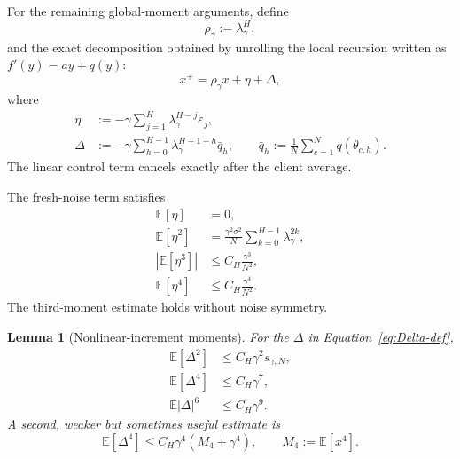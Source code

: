 \documentclass[11pt]{article}
\newtheorem{lemma}[lemma]{Lemma}
\theoremstyle{definition}
\newcommand{\E}{\mathbb{E}}
\newcommand{\smallscale}{s_{\gamma,N}}
\newcommand{\eps}{\varepsilon}
\begin{document}
For the remaining global-moment arguments, define
\[
  \rho_\gamma:=\lambda_\gamma^H,
\]
and the exact decomposition obtained by unrolling the local recursion written as
$f'(y)=ay+q(y)$:
\begin{equation}
\label{eq:global-linear-nonlinear}
  x^+=\rho_\gamma x+\eta+\Delta,
\end{equation}
where
\begin{align}
  \eta&:=-\gamma\sum_{j=1}^H\lambda_\gamma^{H-j}\bar\eps_j,             \label{eq:eta-def}\\
  \Delta&:=-\gamma\sum_{h=0}^{H-1}\lambda_\gamma^{H-1-h}\bar q_h,
  \qquad
  \bar q_h:=\frac1N\sum_{c=1}^N q(\theta_{c,h}).                         \label{eq:Delta-def}
\end{align}
The linear control term cancels exactly after the client average.

The fresh-noise term satisfies
\begin{align}
  \E[\eta]&=0,                                                           \label{eq:eta-mean}\\
  \E[\eta^2]&=\frac{\gamma^2\sigma^2}{N}
  \sum_{k=0}^{H-1}\lambda_\gamma^{2k},                                  \label{eq:eta2}\\
  |\E[\eta^3]|&\le C_H\frac{\gamma^3}{N^2},                            \label{eq:eta3}\\
  \E[\eta^4]&\le C_H\frac{\gamma^4}{N^2}.                             \label{eq:eta4}
\end{align}
The third-moment estimate holds without noise symmetry.

\begin{lemma}[Nonlinear-increment moments]
\label{lem:Delta-moments}
For the $\Delta$ in Equation~\eqref{eq:Delta-def},
\begin{align}
  \E[\Delta^2]&\le C_H\gamma^2\smallscale,                              \label{eq:Delta2}\\
  \E[\Delta^4]&\le C_H\gamma^7,                                         \label{eq:Delta4-sharp}\\
  \E|\Delta|^6&\le C_H\gamma^9.                                         \label{eq:Delta6}
\end{align}
A second, weaker but sometimes useful estimate is
\begin{equation}
\label{eq:Delta4-M4}
  \E[\Delta^4]\le C_H\gamma^4(M_4+\gamma^4),
  \qquad M_4:=\E[x^4].
\end{equation}
\end{lemma}
\end{document}
